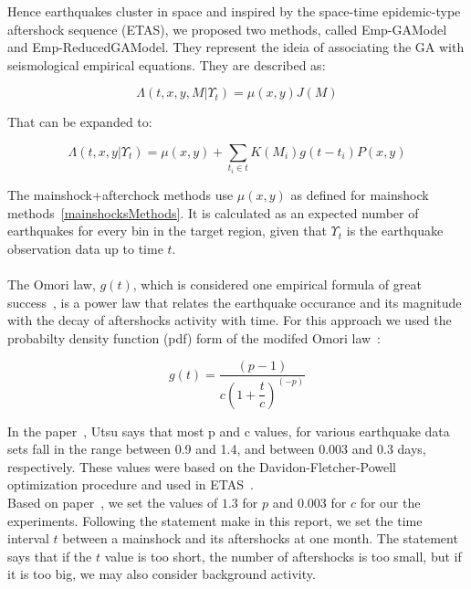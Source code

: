 Hence earthquakes cluster in space and inspired by the space-time epidemic-type aftershock sequence (ETAS), we proposed two methods, called Emp-GAModel and Emp-ReducedGAModel. They represent the ideia of associating the GA with seismological empirical equations. They are described as:

\begin{equation}\label{reducedgamodel}
	\Lambda(t,x,y,M|\Upsilon_t) = \mu(x,y)J(M)
\end{equation}

That can be expanded to:

\begin{equation}\label{emp-model}
 \Lambda(t,x,y|\Upsilon_t) = \mu(x,y) + \displaystyle\sum_{t_i \in t} K(M_i)g(t-t_i)P(x,y)
\end{equation}

The mainshock+afterchock methods use $\mu(x,y)$ as defined for mainshock methods~\ref{mainshocksMethods}. It is calculated as an expected number of earthquakes for every bin in the target region, given that $\Upsilon_t$ is the earthquake observation data up to time $t$.\\\\

The Omori law, $g(t)$, which is considered one empirical formula of great success~\cite{zhuang2004analyzing}\cite{utsu1995centenary}\cite{omori1895after}, is a power law that relates the earthquake occurance and its magnitude
with the decay of aftershocks activity with time. For this approach we used the probabilty density function (pdf) form of the modifed Omori law~\cite{zhuang2004analyzing}:

\begin{equation}\label{omori}
	g(t)= \dfrac{(p-1)}{c(1+ \dfrac{t}{c})^(-p)}
\end{equation}

In the paper~\cite{utsu1995centenary}, Utsu says that most p and c
values, for various earthquake data sets fall in the range between 0.9
and 1.4, and between 0.003 and 0.3 days, respectively. These values
were based on the Davidon-Fletcher-Powell optimization procedure and
used in ETAS~\cite{utsu1995centenary}.\\

Based on paper~\cite{yamanaka1990scaling}, we set the values of $1.3$
for $p$ and $0.003$ for $c$ for our the experiments. Following the
statement make in this report, we set the time interval $t$ between a
mainshock and its aftershocks at one month. The statement says that if
the $t$ value is too short, the number of aftershocks is too small,
but if it is too big, we may also consider background activity.\\

